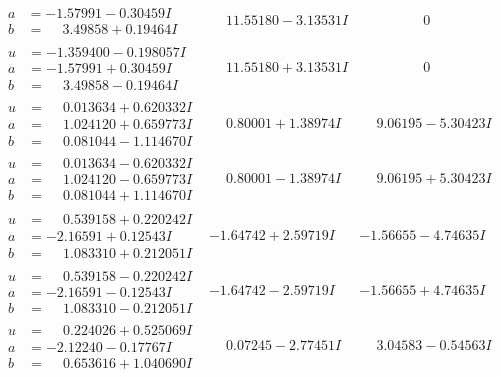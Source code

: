 \documentclass[1p]{elsarticle_modified}
\theoremstyle{definition}
\begin{document}
$$\begin{array}{c|c|c}
\begin{aligned}
a &= -1.57991 - 0.30459 I \\
b &= \phantom{-}3.49858 + 0.19464 I\end{aligned}
 & \phantom{-}11.55180 - 3.13531 I & \phantom{-0.000000 } 0 \\ \hline\begin{aligned}
u &= -1.359400 - 0.198057 I \\
a &= -1.57991 + 0.30459 I \\
b &= \phantom{-}3.49858 - 0.19464 I\end{aligned}
 & \phantom{-}11.55180 + 3.13531 I & \phantom{-0.000000 } 0 \\ \hline\begin{aligned}
u &= \phantom{-}0.013634 + 0.620332 I \\
a &= \phantom{-}1.024120 + 0.659773 I \\
b &= \phantom{-}0.081044 - 1.114670 I\end{aligned}
 & \phantom{-}0.80001 + 1.38974 I & \phantom{-}9.06195 - 5.30423 I \\ \hline\begin{aligned}
u &= \phantom{-}0.013634 - 0.620332 I \\
a &= \phantom{-}1.024120 - 0.659773 I \\
b &= \phantom{-}0.081044 + 1.114670 I\end{aligned}
 & \phantom{-}0.80001 - 1.38974 I & \phantom{-}9.06195 + 5.30423 I \\ \hline\begin{aligned}
u &= \phantom{-}0.539158 + 0.220242 I \\
a &= -2.16591 + 0.12543 I \\
b &= \phantom{-}1.083310 + 0.212051 I\end{aligned}
 & -1.64742 + 2.59719 I & -1.56655 - 4.74635 I \\ \hline\begin{aligned}
u &= \phantom{-}0.539158 - 0.220242 I \\
a &= -2.16591 - 0.12543 I \\
b &= \phantom{-}1.083310 - 0.212051 I\end{aligned}
 & -1.64742 - 2.59719 I & -1.56655 + 4.74635 I \\ \hline\begin{aligned}
u &= \phantom{-}0.224026 + 0.525069 I \\
a &= -2.12240 - 0.17767 I \\
b &= \phantom{-}0.653616 + 1.040690 I\end{aligned}
 & \phantom{-}0.07245 - 2.77451 I & \phantom{-}3.04583 - 0.54563 I \\ \hline\begin{aligned}

\end{aligned}
\end{array}$$
\end{document}

